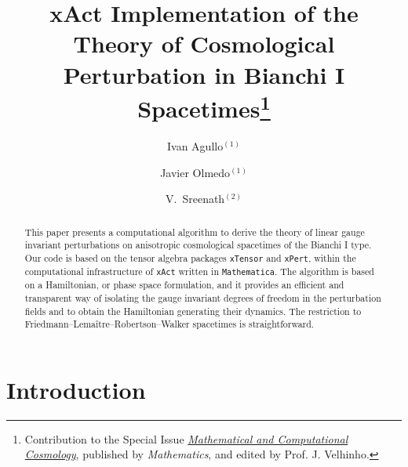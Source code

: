 \documentclass[11pt,tightenlines,eqsecnum,floats,aps,amsmath,amssymb,nofootinbib,prd,floatfix]{revtex4}
\newcommand{\<}{\langle}
\renewcommand{\>}{\rangle}
\begin{document}

\title{xAct Implementation of the Theory of Cosmological Perturbation in Bianchi I Spacetimes\footnote{Contribution to the  Special Issue \href{https://www.mdpi.com/journal/mathematics/special_issues/computational_cosmology}{\it Mathematical and Computational Cosmology}, published by {\it Mathematics}, and edited by Prof. J. Velhinho.}}




\author{Ivan Agullo${}^{(1)}$}
\author{Javier Olmedo${}^{(1)}$}
\author{V.~Sreenath${}^{(2)}$}


\pacs{}
\begin{abstract}
This paper presents a computational algorithm to derive the theory of linear gauge invariant perturbations on anisotropic cosmological spacetimes of the Bianchi I type. Our code is based on the tensor algebra packages {\tt xTensor} and {\tt xPert}, within the computational infrastructure of {\tt xAct} written in {\tt Mathematica}. The algorithm is based on a Hamiltonian, or phase space formulation, and it provides an efficient and transparent way of isolating the gauge invariant degrees of freedom in the perturbation fields and to obtain the Hamiltonian generating their dynamics. The restriction to Friedmann--Lema\^itre--Robertson--Walker spacetimes is straightforward.

\end{abstract}

\maketitle



\section{Introduction}
\label{sec:introduction}
\end{document}
